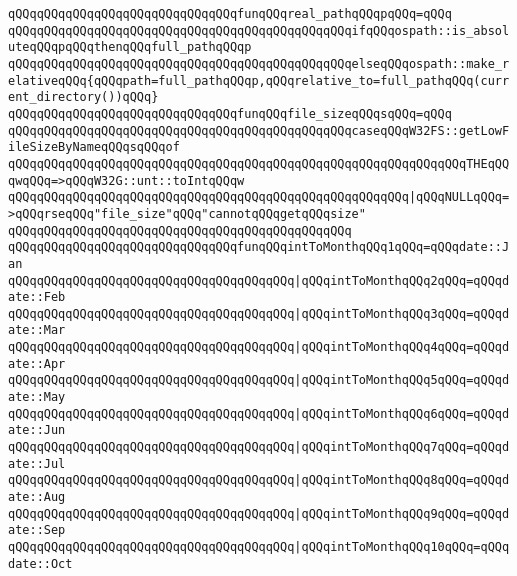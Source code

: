 \newline
\verb|qQQqqQQqqQQqqQQqqQQqqQQqqQQqqQQqfunqQQqreal_pathqQQqpqQQq=qQQq|\newline
\verb|qQQqqQQqqQQqqQQqqQQqqQQqqQQqqQQqqQQqqQQqqQQqqQQqifqQQqospath::is_absoluteqQQqpqQQqthenqQQqfull_pathqQQqp|\newline
\verb|qQQqqQQqqQQqqQQqqQQqqQQqqQQqqQQqqQQqqQQqqQQqqQQqelseqQQqospath::make_relativeqQQq{qQQqpath=full_pathqQQqp,qQQqrelative_to=full_pathqQQq(current_directory())qQQq}|\newline
\newline
\verb|qQQqqQQqqQQqqQQqqQQqqQQqqQQqqQQqfunqQQqfile_sizeqQQqsqQQq=qQQq|\newline
\verb|qQQqqQQqqQQqqQQqqQQqqQQqqQQqqQQqqQQqqQQqqQQqqQQqcaseqQQqW32FS::getLowFileSizeByNameqQQqsqQQqof|\newline
\verb|qQQqqQQqqQQqqQQqqQQqqQQqqQQqqQQqqQQqqQQqqQQqqQQqqQQqqQQqqQQqqQQqTHEqQQqwqQQq=>qQQqW32G::unt::toIntqQQqw|\newline
\verb|qQQqqQQqqQQqqQQqqQQqqQQqqQQqqQQqqQQqqQQqqQQqqQQqqQQqqQQq|\verb#|qQQqNULLqQQq=>qQQqrseqQQq"file_size"qQQq"cannotqQQqgetqQQqsize"#\newline
\verb|qQQqqQQqqQQqqQQqqQQqqQQqqQQqqQQqqQQqqQQqqQQqqQQq|\newline
\verb|qQQqqQQqqQQqqQQqqQQqqQQqqQQqqQQqfunqQQqintToMonthqQQq1qQQq=qQQqdate::Jan|\newline
\verb|qQQqqQQqqQQqqQQqqQQqqQQqqQQqqQQqqQQqqQQq|\verb#|qQQqintToMonthqQQq2qQQq=qQQqdate::Feb#\newline
\verb|qQQqqQQqqQQqqQQqqQQqqQQqqQQqqQQqqQQqqQQq|\verb#|qQQqintToMonthqQQq3qQQq=qQQqdate::Mar#\newline
\verb|qQQqqQQqqQQqqQQqqQQqqQQqqQQqqQQqqQQqqQQq|\verb#|qQQqintToMonthqQQq4qQQq=qQQqdate::Apr#\newline
\verb|qQQqqQQqqQQqqQQqqQQqqQQqqQQqqQQqqQQqqQQq|\verb#|qQQqintToMonthqQQq5qQQq=qQQqdate::May#\newline
\verb|qQQqqQQqqQQqqQQqqQQqqQQqqQQqqQQqqQQqqQQq|\verb#|qQQqintToMonthqQQq6qQQq=qQQqdate::Jun#\newline
\verb|qQQqqQQqqQQqqQQqqQQqqQQqqQQqqQQqqQQqqQQq|\verb#|qQQqintToMonthqQQq7qQQq=qQQqdate::Jul#\newline
\verb|qQQqqQQqqQQqqQQqqQQqqQQqqQQqqQQqqQQqqQQq|\verb#|qQQqintToMonthqQQq8qQQq=qQQqdate::Aug#\newline
\verb|qQQqqQQqqQQqqQQqqQQqqQQqqQQqqQQqqQQqqQQq|\verb#|qQQqintToMonthqQQq9qQQq=qQQqdate::Sep#\newline
\verb|qQQqqQQqqQQqqQQqqQQqqQQqqQQqqQQqqQQqqQQq|\verb#|qQQqintToMonthqQQq10qQQq=qQQqdate::Oct#\newline
